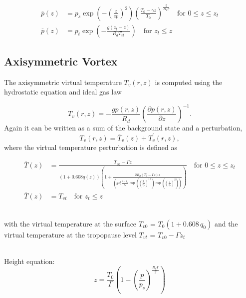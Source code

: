 \documentclass[times,doublespace]{fldauth}
\begin{document}
\begin{equation}
\begin{split}
\overline{p}(z)&=p_s \exp\left(-\left(\frac{z}{zp}\right)^{2}\right)\left(\frac{T_0-\gamma z}{T_0}\right)^{\frac{g}{R_d\gamma}} \text{ ~~for   } 0 \leq z \leq z_t \\
\overline{p}(z)&=p_t \exp\left(-\frac{g(z_t-z)}{R_dT_{vt}}\right) \text{ ~~for   }  z_t \leq z
\end{split}
\end{equation}



\subsection*{Axisymmetric Vortex}

The axisymmetric virtual temperature $T_v(r,z)$ is computed using the hydrostatic equation and ideal gas law


\begin{equation}
T_v(r,z) = -\frac{g p(r,z)}{R_d} \left( \frac{\partial p(r,z)}{ \partial z} \right)^{-1}.
\end{equation}  Again it can be written as a sum of the background state and a perturbation,
\begin{equation} \label{eq:virt_temp}
T_v(r,z) = \overline{T}_v(z) + T_v^\prime(r,z),
\end{equation} where the virtual temperature perturbation is defined as


\begin{equation}
\begin{split}
\overline{T}(z)&=\frac{T_{v0}-\Gamma z}{(1+0.608q(z))\left(1+\frac{2R_d(T_0-\Gamma z)z}{\left( g z_p^2\frac{1-p_s}{\delta_p}\exp\left(\left(\frac{g_r}{r_p}\right)^{1.5}\right)\exp\left(\left(\frac{z}{z_p}\right)^2\right) \right)}   \right)} \text{ ~~for   } 0 \leq z \leq z_t \\
\overline{T}(z)&=T_{vt}  \text{ ~~for   }  z_t \leq z
\end{split}
\end{equation}

~\\with the virtual temperature at the surface $T_{v0}$ = $T_0 (1+0.608 \, q_0)$ and the virtual temperature at the tropopause level $T_{vt}$ = $T_{v0} - \Gamma z_t$

~\\Height equation:
\begin{equation}
z=\frac{T_0}{\Gamma}\left(1-\left(\frac{p}{p_s}\right) ^{\frac{R_d\Gamma}{g}}\right)
\end{equation}
\end{document}
